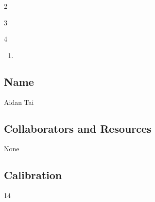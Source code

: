 \documentclass[submit]{harvardml}
\begin{document}
\newpage
\begin{sol}{}{2}


\end{sol}

\newpage
\begin{sol}{}{3}

\end{sol}

\newpage
\begin{sol}{}{4}
  \begin{enumerate}
    \item 
  \end{enumerate}
\end{sol}

\newpage
\subsection*{Name}
Aidan Tai

\subsection*{Collaborators and Resources}
None

\subsection*{Calibration}
14
\end{document}

